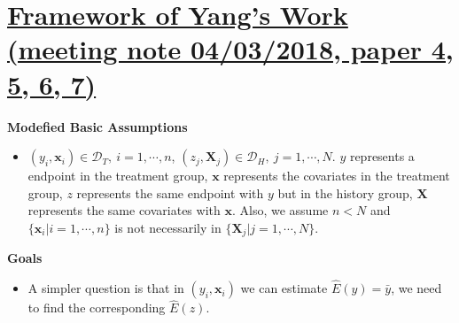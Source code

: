 \documentclass{article}
\begin{document}
\hrulefill{}\hrulefill
\section{\href{/Users/wangbiju/Documents/Documents/UConn/Research/Single_Arm/Meeting_Notes/04/03/2018.txt}{Framework of Yang's Work (meeting note 04/03/2018, paper 4, 5, 6, 7)}}
\textbf{\indent Modefied Basic Assumptions}
\begin{itemize}
\item $(y_{i}, \mathbf{x}_{i})\in\mathscr{D}_{T}, ~i=1, \cdots, n$, $(z_{j}, \mathbf{X}_{j})\in\mathscr{D}_{H},~j=1, \cdots, N$. $y$ represents a endpoint in the treatment group, $\mathbf{x}$ represents the covariates in the treatment group, $z$ represents the same endpoint with $y$ but in the history group, $\mathbf{X}$ represents the same covariates with $\mathbf{x}$. Also, we assume $n<N$ and $\{\mathbf{x}_{i}|i=1,\cdots, n\}$ is not necessarily in $\{\mathbf{X}_{j}|j=1,\cdots, N\}$.
\end{itemize}

\textbf{Goals}
\begin{itemize}
\item A simpler question is that in $(y_{i}, \mathbf{x}_{i})$ we can estimate $\hat{E}(y)=\bar{y}$, we need to find the corresponding $\hat{E}(z)$.
\end{itemize}
\end{document}

